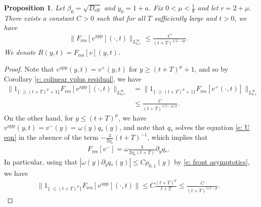 \documentclass[11pt]{article}
\newtheorem{prop}{Proposition}
\numberwithin{equation}{section}
\numberwithin{prop}{section}
\newcommand{\Deff}{D_\mathrm{eff}}
\begin{document}
\begin{prop}\label{p: colinear residual}
	Let $\beta_0 = \sqrt{\Deff}$ and $y_0 = 1+a$. Fix $0 < \mu < \frac{1}{8}$ and let $r = 2 + \mu$. There exists a constant $C > 0$ such that for all $T$ sufficiently large and $t > 0$, we have 
	\begin{align}
	\| F_\mathrm{res} [v^\mathrm{app}] (\cdot, t) \|_{L^\infty_{0, r}} \leq \frac{C}{(t+T)^{1/2-4\mu}}. \label{e: colinear residual estimate}
	\end{align}
	We denote $R (y,t) = F_\mathrm{res}[v](y,t)$. 
\end{prop}
\begin{proof}
	Note that $v^\mathrm{app}(y,t) = v^+(y,t)$ for $y \geq (t+T)^\mu + 1$, and so by Corollary \ref{c: colinear vplus residual}, we have
	\begin{align}
	\| 1_{\{ \cdot \geq (t+T)^\mu + 1\}} F_\mathrm{res} [v^\mathrm{app}] (\cdot, t) \|_{L^\infty_{0, r}} &= \| 1_{\{ \cdot \geq (t+T)^\mu + 1\}} F_\mathrm{res} [v^+(\cdot, t)] \|_{L^\infty_{0, r}} \\
	&\leq \frac{C}{(t+T)^{1/2 - \mu/2}}. 
	\end{align}
	On the other hand, for $y \leq (t+T)^\mu$, we have $v^\mathrm{app} (y,t) = v^-(y) = \omega(y) q_*(y)$, and note that $q_*$ solves the equation \eqref{e: U eqn} in the absence of the term $-\frac{3}{2 \eta_*} (t+T)^{-1}$, which implies that
	\begin{align*}
		F_\mathrm{res} [v^-] = \omega \frac{3}{2\eta_* (t+T)} \partial_y q_*.
	\end{align*}
	In particular, using that $|\omega (y)\partial_y q_*(y)| \leq C \rho_{0,1}(y)$ by \eqref{e: front asymptotics}, we have
	\begin{align*}
	\| 1_{\{\cdot \leq (t+T)^\mu\}} F_\mathrm{res} [v^\mathrm{app}] (\cdot, t) \| \leq C \frac{(t+T)^\mu}{t+T} \leq \frac{C}{(t+T)^{1/2-\mu}}. 
	\end{align*}
	

\end{proof}
\end{document}
